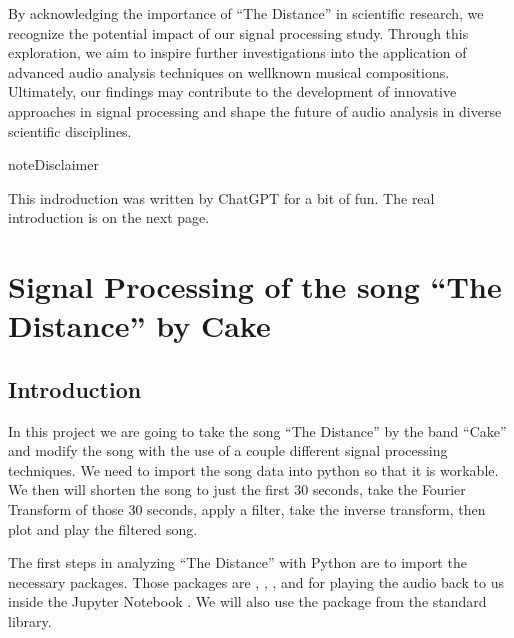 \documentclass[letterpaper,10pt,english]{jupyterBook}
\begin{document}
\sphinxAtStartPar
By acknowledging the importance of “The Distance” in scientific research, we recognize the potential impact of our signal processing study. Through this exploration, we aim to inspire further investigations into the application of advanced audio analysis techniques on well\sphinxhyphen{}known musical compositions. Ultimately, our findings may contribute to the development of innovative approaches in signal processing and shape the future of audio analysis in diverse scientific disciplines.

\begin{sphinxadmonition}{note}{Disclaimer}

\sphinxAtStartPar
This indroduction was written by ChatGPT for a bit of fun. The real introduction is on the next page.
\end{sphinxadmonition}

\sphinxstepscope


\chapter{Signal Processing of the song “The Distance” by Cake}
\label{\detokenize{content/0_project_part2:signal-processing-of-the-song-the-distance-by-cake}}\label{\detokenize{content/0_project_part2::doc}}

\section{Introduction}
\label{\detokenize{content/0_project_part2:introduction}}
\sphinxAtStartPar
In this project we are going to take the song “The Distance” by the band “Cake” and modify the song with the use of a couple different signal processing techniques. We need to import the song data into python so that it is workable. We then will shorten the song to just the first 30 seconds, take the Fourier Transform of those 30 seconds, apply a filter, take the inverse transform, then plot and play the filtered song.

\sphinxAtStartPar
The first steps in analyzing “The Distance” with Python are to import the necessary packages. Those packages are , , , and for playing the audio back to us inside the Jupyter Notebook . We will also use the  package from the standard library.
\end{document}
